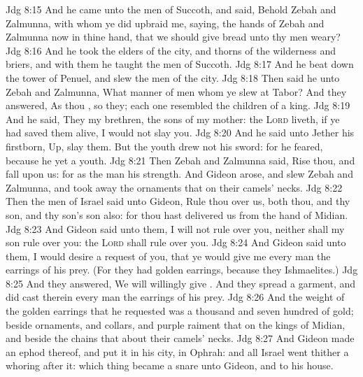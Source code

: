 \vs Jdg 8:15 And he came unto the men of Succoth, and said, Behold Zebah and Zalmunna, with whom ye did upbraid me, saying,  the hands of Zebah and Zalmunna now in thine hand, that we should give bread unto thy men  weary?
\vs Jdg 8:16 And he took the elders of the city, and thorns of the wilderness and briers, and with them he taught the men of Succoth.
\vs Jdg 8:17 And he beat down the tower of Penuel, and slew the men of the city.
\vs Jdg 8:18 Then said he unto Zebah and Zalmunna, What manner of men  whom ye slew at Tabor? And they answered, As thou , so  they; each one resembled the children of a king.
\vs Jdg 8:19 And he said, They  my brethren,  the sons of my mother:  the \textsc{Lord} liveth, if ye had saved them alive, I would not slay you.
\vs Jdg 8:20 And he said unto Jether his firstborn, Up,  slay them. But the youth drew not his sword: for he feared, because he  yet a youth.
\vs Jdg 8:21 Then Zebah and Zalmunna said, Rise thou, and fall upon us: for as the man  his strength. And Gideon arose, and slew Zebah and Zalmunna, and took away the ornaments that  on their camels' necks.
\vs Jdg 8:22 Then the men of Israel said unto Gideon, Rule thou over us, both thou, and thy son, and thy son's son also: for thou hast delivered us from the hand of Midian.
\vs Jdg 8:23 And Gideon said unto them, I will not rule over you, neither shall my son rule over you: the \textsc{Lord} shall rule over you.
\vs Jdg 8:24 And Gideon said unto them, I would desire a request of you, that ye would give me every man the earrings of his prey. (For they had golden earrings, because they  Ishmaelites.)
\vs Jdg 8:25 And they answered, We will willingly give . And they spread a garment, and did cast therein every man the earrings of his prey.
\vs Jdg 8:26 And the weight of the golden earrings that he requested was a thousand and seven hundred  of gold; beside ornaments, and collars, and purple raiment that  on the kings of Midian, and beside the chains that  about their camels' necks.
\vs Jdg 8:27 And Gideon made an ephod thereof, and put it in his city,  in Ophrah: and all Israel went thither a whoring after it: which thing became a snare unto Gideon, and to his house.
